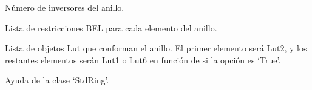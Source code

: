\documentclass[letterpaper,10pt,english]{sphinxmanual}
\begin{document}
\begin{fulllineitems}
\begin{quote}
\begin{description}
\begin{itemize}
\end{itemize}

\end{description}\end{quote}

\begin{fulllineitems}
\label{\detokenize{fpga.ring_osc:fpga.ring_osc.StdRing.N_inv}}
\pysigstartsignatures
{}
\pysigstopsignatures
\sphinxAtStartPar
Número de inversores del anillo.

\end{fulllineitems}


\begin{fulllineitems}
\label{\detokenize{fpga.ring_osc:fpga.ring_osc.StdRing.bel}}
\pysigstartsignatures
{}
\pysigstopsignatures
\sphinxAtStartPar
Lista de restricciones BEL para cada elemento del anillo.

\end{fulllineitems}


\begin{fulllineitems}
\label{\detokenize{fpga.ring_osc:fpga.ring_osc.StdRing.elements}}
\pysigstartsignatures
{}
\pysigstopsignatures
\sphinxAtStartPar
Lista de objetos Lut que conforman el anillo. El primer elemento será Lut2, y los restantes  elementos serán Lut1 o Lut6 en función de si la opción  es ‘True’.

\end{fulllineitems}


\begin{fulllineitems}
\label{\detokenize{fpga.ring_osc:fpga.ring_osc.StdRing.help}}
\pysigstartsignatures
{}
\pysigstopsignatures
\sphinxAtStartPar
Ayuda de la clase ‘StdRing’.


\end{fulllineitems}
\end{fulllineitems}
\end{document}
